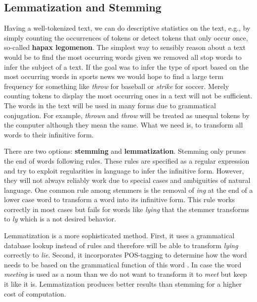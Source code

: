 \subsection{Lemmatization and Stemming}\label{stemming}
  Having a well-tokenized text, we can do descriptive statistics on the text, e.g., by simply counting the occurrences of tokens or detect tokens that only occur once, so-called \textbf{hapax legomenon}.
  The simplest way to sensibly reason about a text would be to find the most occurring words given we removed all stop words to infer the subject of a text.
  If the goal was to infer the type of sport based on the most occurring words in sports news we would hope to find a large term frequency for something like \textit{throw} for baseball or \textit{strike} for soccer.
  Merely counting tokens to display the most occurring ones in a text will not be sufficient.
  The words in the text will be used in many forms due to grammatical conjugation.
  For example, \textit{thrown} and \textit{throw} will be treated as unequal tokens by the computer although they mean the same.
  What we need is, to transform all words to their infinitive form.

  There are two options: \textbf{stemming} and \textbf{lemmatization}.
  Stemming only prunes the end of words following rules.
  These rules are specified as a regular expression and try to exploit regularities in language to infer the infinitive form.
  However, they will not always reliably work due to special cases and ambiguities of natural language.
  One common rule among stemmers is the removal of \textit{ing} at the end of a lower case word to transform a word into its infinitive form.
  This rule works correctly in most cases but fails for words like \textit{lying} that the stemmer transforms to \textit{ly} which is a not desired behavior.

  Lemmatization is a more sophisticated method.
  First, it uses a grammatical database lookup instead of rules and therefore will be able to transform \textit{lying} correctly to \textit{lie}.
  Second, it incorporates POS-tagging to determine how the word needs to be based on the grammatical function of this word \citep{Muller2015}.
  In case the word \textit{meeting} is used as a noun than we do not want to transform it to \textit{meet} but keep it like it is.
  Lemmatization produces better results than stemming \citep{Balakrishnan2014}  for a higher cost of computation.


